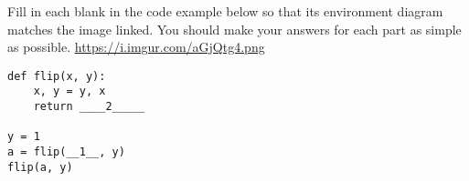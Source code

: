 \begin{blocksection}
\question Fill in each blank in the code example below so that its environment diagram matches the image linked. You should make your answers for each part as simple as possible.
\newline
\url{https://i.imgur.com/aGjQtg4.png}
\newline

\begin{lstlisting}
def flip(x, y):
    x, y = y, x
    return ____2_____

y = 1
a = flip(__1__, y)
flip(a, y)
\end{lstlisting}

\end{blocksection}
\begin{blocksection}
\end{blocksection}